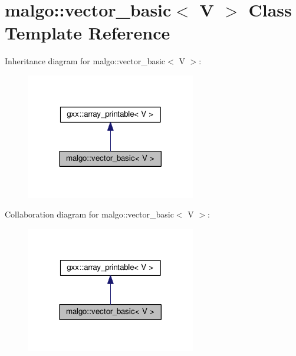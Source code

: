 \hypertarget{classmalgo_1_1vector__basic}{}\section{malgo\+:\+:vector\+\_\+basic$<$ V $>$ Class Template Reference}
\label{classmalgo_1_1vector__basic}


Inheritance diagram for malgo\+:\+:vector\+\_\+basic$<$ V $>$\+:
\nopagebreak
\begin{figure}[H]
\begin{center}
\leavevmode
\includegraphics[width=209pt]{classmalgo_1_1vector__basic__inherit__graph}
\end{center}
\end{figure}


Collaboration diagram for malgo\+:\+:vector\+\_\+basic$<$ V $>$\+:
\nopagebreak
\begin{figure}[H]
\begin{center}
\leavevmode
\includegraphics[width=209pt]{classmalgo_1_1vector__basic__coll__graph}
\end{center}
\end{figure}
